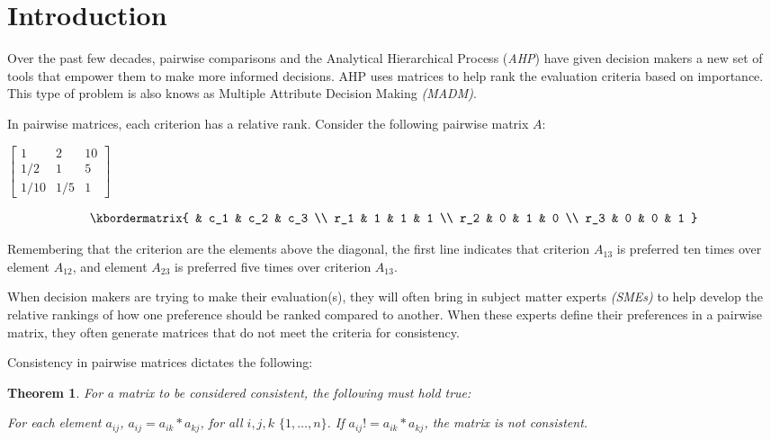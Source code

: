 \documentclass[12pt]{amsart}
\newtheorem{theorem}{Theorem}
\theoremstyle{definition}
\begin{document}
\newpage
\tableofcontents
\newpage
\newpage



\section{Introduction}

Over the past few decades, pairwise comparisons and the Analytical Hierarchical Process (\textit{AHP}) have given decision makers a new set of tools that empower them to make more informed decisions.  AHP uses matrices to help rank the evaluation criteria based on importance.  This type of problem is also knows as Multiple Attribute Decision Making \textit{(MADM)}.

In pairwise matrices, each criterion has a relative rank.  Consider the following pairwise matrix $A$:
\begin{center}
$
\begin{bmatrix}
    1    & 2   & 10 \\
    1/2  & 1   & 5 \\
    1/10 & 1/5 & 1 
\end{bmatrix}
$


\[
\kbordermatrix{
    & c_1 & c_2 & c_3 \\
    r_1 & 1 & 1 & 1 \\
    r_2 & 0 & 1 & 0  \\
    r_3 & 0 & 0 & 1 
  }
\]

\end{center}

Remembering that the criterion are the elements above the diagonal, the first line indicates that criterion $A_{13}$ is preferred ten times over element $A_{12}$, and element $A_{23}$ is preferred five times over criterion $A_{13}$.

When decision makers are trying to make their evaluation(s), they will often bring in subject matter experts \textit{(SMEs)} to help develop the relative rankings of how one preference should be ranked compared to another.  When these experts define their preferences in a pairwise matrix, they often generate matrices that do not meet the criteria for consistency.

Consistency in pairwise matrices dictates the following:
\begin{theorem}
For a matrix to be considered consistent, the following must hold true:

For each element $a_{ij}$, $a_{ij}=a_{ik}*a_{kj}$, for all $i,j,k$ $\{1,\dots,n\}$. If $a_{ij}!=a_{ik}*a_{kj}$, the matrix is not consistent.
\end{theorem}
\end{document}
